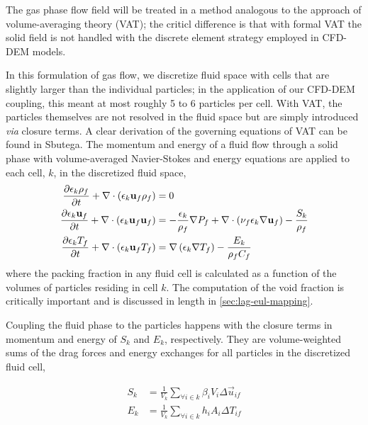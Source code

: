The gas phase flow field will be treated in a method analogous to the approach of volume-averaging theory (VAT); the criticl difference is that with formal VAT the solid field is not handled with the discrete element strategy employed in CFD-DEM models.\cite{Tsuji1992} 

In this formulation of gas flow, we discretize fluid space with cells that are slightly larger than the individual particles; in the application of our CFD-DEM coupling, this meant at most roughly 5 to 6 particles per cell. With VAT, the particles themselves are not resolved in the fluid space but are simply introduced \textit{via} closure terms.\cite{Sbutega2013,Horvat2006} A clear derivation of the governing equations of VAT can be found in Sbutega\etal.\cite{Sbutega2013} The momentum and energy of a fluid flow through a solid phase with volume-averaged Navier-Stokes and energy equations are applied to each cell, $k$, in the discretized fluid space,
\begin{subequations}\label{eq:cfd-equations}
\begin{align}
\pder[\epsilon_k \rho_f]{t} + \nabla\cdot(\epsilon_k \vec{u}_f \rho_f) &= 0\\
\pder[\epsilon_k \vec{u}_f]{t} + \nabla\cdot(\epsilon_k \vec{u}_f \vec{u}_f) &= -\frac{\epsilon_k}{\rho_f}\nabla P_f + \nabla\cdot\left(\nu_f\epsilon_k\nabla \vec{u}_f\right) - \frac{S_k}{\rho_f}\\
\pder[\epsilon_k T_f]{t} + \nabla\cdot(\epsilon_k \vec{u}_f T_f) &= \nabla\left(\epsilon_k\nabla T_f\right)-\frac{E_k}{\rho_fC_f}
\end{align}
\end{subequations}
where the packing fraction in any fluid cell is calculated as a function of the volumes of particles residing in cell $k$. The computation of the void fraction is critically important and is discussed in length in \cref{sec:lag-eul-mapping}.

Coupling the fluid phase to the particles happens with the closure terms in momentum and energy of $S_k$ and $E_k$, respectively. They are volume-weighted sums of the drag forces and energy exchanges for all particles in the discretized fluid cell,

\begin{subequations}\label{eq:cfd-sources}
\begin{align}
	S_k &= \frac{1}{V_k}\sum_{\forall i \in k} \beta_i V_i \Delta \vec{u}_{if} \label{eq:cfd-mom-source}\\
	E_k &= \frac{1}{V_k}\sum_{\forall i \in k} h_i A_i \Delta T_{if}
\end{align}
\end{subequations}

